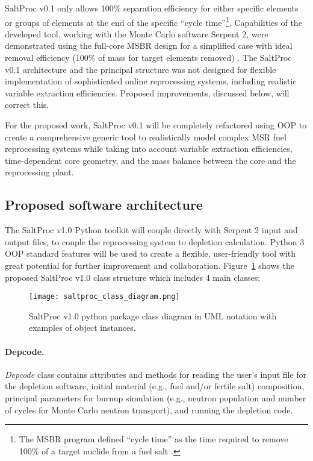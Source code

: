 SaltProc v0.1 only allows 100\% separation efficiency for either specific 
elements or groups of elements at the end of the specific ``cycle 
time''\footnote{The \gls{MSBR} program defined ``cycle time'' as the time 
required to remove 100\% of a target nuclide from a fuel salt 
\cite{robertson_conceptual_1971}.}. Capabilities of the developed tool, 
working with the Monte Carlo software Serpent 2, were demonstrated using the 
full-core MSBR design for a simplified case with ideal removal efficiency 
(100\% of mass for target elements removed) \cite{rykhlevskii_modeling_2019}. 
The SaltProc v0.1 architecture and the principal structure was not designed 
for flexible implementation of sophisticated online reprocessing systems, 
including realistic variable extraction efficiencies.  Proposed improvements, 
discussed below, will correct this.

For the proposed work, SaltProc v0.1 will be completely refactored using 
\gls{OOP} to create a comprehensive generic tool to realistically model 
complex \gls{MSR} fuel reprocessing systems while taking into account 
variable extraction efficiencies, time-dependent core geometry, and the mass 
balance between the core and the reprocessing plant.

\subsection{Proposed software architecture}
The SaltProc v1.0 Python toolkit will couple directly with Serpent 2 input 
and output files, to couple the reprocessing system to depletion calculation. 
Python 3 \gls{OOP} standard features will be used to create a flexible, 
user-friendly tool with great potential for further improvement and 
collaboration. Figure~\ref{fig:saltproc_class} shows the proposed SaltProc 
v1.0 class structure which includes 4 main classes:
\begin{figure}[ht!] %
	\texttt{[image: saltproc\_class\_diagram.png]}
	\vspace{-0.15in}
	\caption{SaltProc v1.0 python package class diagram in UML notation 
		with examples of object instances.}
	\label{fig:saltproc_class}
\end{figure}
\paragraph{Depcode.}\textit{Depcode} class contains attributes and methods for 
reading the user's input file for the depletion software, initial material 
(e.g., fuel and/or fertile salt) composition, principal parameters for burnup 
simulation (e.g., neutron population and number of cycles for Monte Carlo 
neutron transport), and running the depletion code.
